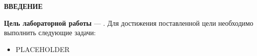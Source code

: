 \begin{center}
    \textbf{ВВЕДЕНИЕ}
\end{center}


\textbf{Цель лабораторной работы} --- . Для достижения поставленной цели необходимо выполнить следующие задачи:

\begin{itemize}
	\item PLACEHOLDER
\end{itemize}